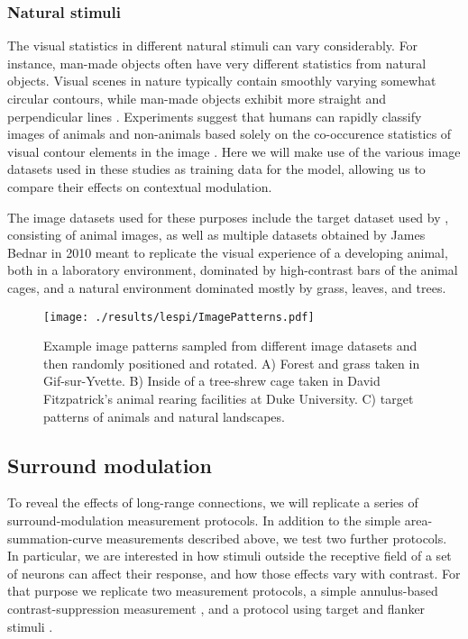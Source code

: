 \subsubsection*{Natural stimuli}

The visual statistics in different natural stimuli can vary
considerably.  For instance, man-made objects often have very
different statistics from natural objects. Visual scenes in nature
typically contain smoothly varying somewhat circular contours, while
man-made objects exhibit more straight and perpendicular lines
\citep{Perrinet2015}. Experiments suggest that humans can rapidly
classify images of animals and non-animals based solely on the
co-occurence statistics of visual contour elements in the image
\citep{Serre2007, Perrinet2015}. Here we will make use of the various
image datasets used in these studies as training data for the model,
allowing us to compare their effects on contextual modulation.

The image datasets used for these purposes include the target dataset
used by \cite{Serre2007}, consisting of animal images, as well as
multiple datasets obtained by James Bednar in 2010 meant to replicate the
visual experience of a developing animal, both in a laboratory environment,
dominated by high-contrast bars of the animal cages, and a
natural environment dominated mostly by grass, leaves, and trees.

\begin{figure}
	\centering
	\texttt{[image: ./results/lespi/ImagePatterns.pdf]}
	\caption[Example image patterns used to train the model] {Example
      image patterns sampled from different image datasets and then
      randomly positioned and rotated. A) Forest and grass taken in
      Gif-sur-Yvette. B) Inside of a tree-shrew cage taken in David
      Fitzpatrick's animal rearing facilities at Duke University.
      C) \cite{Serre2007} target patterns of animals and natural landscapes.}
    \label{image_patterns}
\end{figure}

\subsection{Surround modulation}

To reveal the effects of long-range connections, we will replicate a
series of surround-modulation measurement protocols. In addition to
the simple area-summation-curve measurements described above, we test
two further protocols.  In particular, we are interested in how
stimuli outside the receptive field of a set of neurons can affect
their response, and how those effects vary with contrast. For that
purpose we replicate two measurement protocols, a simple annulus-based
contrast-suppression measurement \citep{Jones2002}, and a protocol
using target and flanker stimuli \citep{Kapadia1995}.

